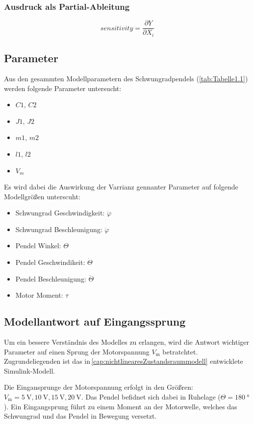 \subsubsection*{Ausdruck als Partial-Ableitung}
\begin{equation}
    sensitivity=\frac{\partial Y}{\partial X_i}
\end{equation}

%    
\subsection{Parameter}
Aus den gesammten Modellparametern des Schwungradpendels (\ref{tab:Tabelle1.1}) werden folgende Parameter untersucht:
\begin{itemize}
    \item $C1,\, C2$
    \item $J1,\, J2$
    \item $m1,\, m2$
    \item $l1,\, l2$
    \item $V_m$
\end{itemize}
Es wird dabei die Auswirkung der Varrianz gennanter Parameter auf folgende Modellgrößen unterscuht:
\begin{itemize}
    \item Schwungrad Geschwindigkeit: $\dot\varphi$
    \item Schwungrad Beschleunigung: $\ddot\varphi$
    \item Pendel Winkel: $\Theta$
    \item Pendel Geschwindikeit: $\dot\Theta$
    \item Pendel Beschleunigung: $\ddot\Theta$
    \item Motor Moment: $\tau$
\end{itemize}
\subsection*{Modellantwort auf Eingangssprung}

Um ein bessere Verständnis des Modelles zu erlangen, wird die Antwort wichtiger Parameter auf einen Sprung der Motorspannung $V_{\mathrm{m}}$ betratchtet.
Zugrundeliegenden ist das in\,\ref{cap:nichtlinearesZustandsraummodell} entwicklete Simulink-Modell.

Die Eingansprunge der Motorspannung erfolgt in den Größren: $V_{\mathrm{m}}=\SI{5}{\volt},\SI{10}{\volt},\SI{15}{\volt},\SI{20}{\volt}$.
Das Pendel befidnet sich dabei in Ruhelage ($\Theta=\SI{180}{\degree}$). 
Ein Eingangsprung führt zu einem Moment an der Motorwelle, welches das Schwungrad und das Pendel in Bewegung versetzt.\\

